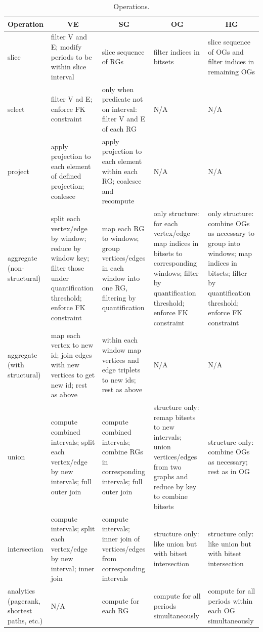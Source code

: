 \begin{table}[t]
\centering
\small
\begin{tabular}{ p{1.6cm} | p{3.5cm} | p{3.5cm} | p{3.5cm} | p{3.5cm} }
\hline
\multicolumn{1}{l|}{\bfseries Operation} & \multicolumn{1}{c|}{\bfseries VE} & \multicolumn{1}{c|}{\bfseries SG} & \multicolumn{1}{c|}{\bfseries OG} & \multicolumn{1}{c|}{\bfseries HG} \\ \hline
slice & filter V and E; modify periods to be within slice interval & slice sequence of RGs & filter indices in bitsets & slice sequence of OGs and filter indices in remaining OGs \\ \hline
select & filter V ad E; enforce FK constraint & only when predicate not on interval: filter V and E of each RG & N/A & N/A \\ \hline
project & apply projection to each element of defined projection; coalesce & apply projection to each element within each RG; coalesce and recompute & N/A & N/A \\ \hline
aggregate (non-structural) & split each vertex/edge by window; reduce by window key; filter those under quantification threshold; enforce FK constraint & map each RG to windows; group vertices/edges in each window into one RG, filtering by quantification & only structure: for each vertex/edge map indices in bitsets to corresponding windows; filter by quantification threshold; enforce FK constraint & only structure: combine OGs as necessary to group into windows; map indices in bitsets; filter by quantification threshold; enforce FK constraint \\ \hline
aggregate (with structural) & map each vertex to new id; join edges with new vertices to get new id; rest as above & within each window map vertices and edge triplets to new ids; rest as above & N/A & N/A \\ \hline
union & compute combined intervals; split each vertex/edge by new intervals; full outer join & compute combined intervals; combine RGs in corresponding intervals; full outer join & structure only: remap bitsets to new intervals; union vertices/edges from two graphs and reduce by key to combine bitsets & structure only: combine OGs as necessary; rest as in OG \\ \hline
intersection & compute intervals; split each vertex/edge by new interval; inner join & compute intervals; inner join of vertices/edges from corresponding intervals & structure only: like union but with bitset intersection & structure only: like union but with bitset intersection \\ \hline
analytics (pagerank, shortest paths, etc.) & N/A & compute for each RG & compute for all periods simultaneously & compute for all periods within each OG simultaneously \\ 
\hline
\end{tabular}
\caption{Operations.}
\label{tab:operations}
\end{table}


